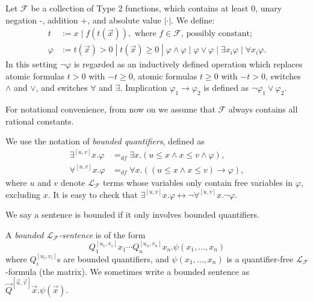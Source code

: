 \documentclass[envcountsect]{llncs}
\begin{document}
\begin{definition}
Let $\mathcal{F}$ be a collection of Type 2 functions, which contains at least $0$, unary negation -, addition $+$, and absolute value $|\cdot|$. We define:
\begin{align*}
t& := x \; | \; f(t(\vec x)), \mbox{ where }f\in \mathcal{F}\mbox{, possibly constant};\\
\varphi& := t(\vec x)> 0 \; | \; t(\vec x)\geq 0 \; | \; \varphi\wedge\varphi \; | \; \varphi\vee\varphi \; | \; \exists x_i\varphi \; |\; \forall x_i\varphi.
\end{align*}
In this setting $\neg\varphi$ is regarded as an inductively defined operation which replaces atomic formulas $t>0$ with $-t\geq 0$, atomic formulas $t\geq 0$ with $-t>0$, switches $\wedge$ and $\vee$, and switches $\forall$ and $\exists$. Implication $\varphi_1\rightarrow\varphi_2$ is defined as $\neg\varphi_1\vee\varphi_2$.
\end{definition}

For notational convenience, from now on we assume that $\mathcal{F}$ always contains all rational constants. 

\begin{definition}
We use the notation of {\em bounded quantifiers}, defined as
\begin{align*}
\exists^{[u,v]}x.\varphi &=_{df}\exists x. ( u \leq x \land x \leq v \wedge \varphi),\\
\forall^{[u,v]}x.\varphi &=_{df} \forall x. ( (u \leq x \land x \leq v) \rightarrow \varphi),
\end{align*}
where $u$ and $v$ denote $\mathcal{L}_{\mathcal{F}}$ terms whose variables only contain free variables in $\varphi$, excluding $x$. It is easy to check that $\exists^{[u,v]}x. \varphi \leftrightarrow \neg \forall^{[u,v]}x. \neg\varphi$. 
\end{definition}

We say a sentence is bounded if it only involves bounded quantifiers. 

\begin{definition}
A {\em bounded $\mathcal{L}_{\mathcal{F}}$-sentence} is of the form
$$Q_1^{[u_1,v_1]}x_1\cdots Q_n^{[u_n,v_n]}x_n. \psi(x_1,...,x_n)$$
where $Q_i^{[u_i,v_i]}$s are bounded quantifiers, and $\psi(x_1,...,x_n)$ is a quantifier-free $\mathcal{L}_{\mathcal{F}}$-formula (the matrix). We sometimes write a bounded sentence as $\vec Q^{[\vec u,\vec v]}\vec x.\psi(\vec x)$. 
 
\end{definition}
\end{document}
